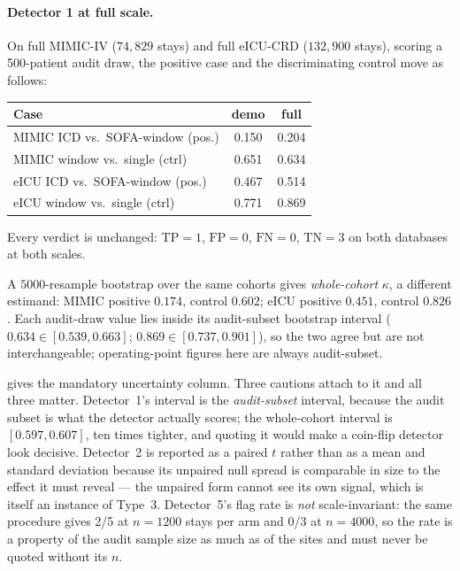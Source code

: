 \documentclass[pmlr,twocolumn,10pt]{jmlr}
\begin{document}
\paragraph{Detector 1 at full scale.} On full MIMIC-IV ($74{,}829$ stays) and
full eICU-CRD ($132{,}900$ stays), scoring a 500-patient audit draw, the
positive case and the discriminating control move as follows:

\begin{center}\footnotesize
\begin{tabular}{@{}lcc@{}}
\toprule
\bfseries Case & \bfseries demo & \bfseries full\\
\midrule
MIMIC ICD vs.\ SOFA-window (pos.) & 0.150 & 0.204\\
MIMIC window vs.\ single (ctrl)   & 0.651 & 0.634\\
eICU ICD vs.\ SOFA-window (pos.)  & 0.467 & 0.514\\
eICU window vs.\ single (ctrl)    & 0.771 & 0.869\\
\bottomrule
\end{tabular}\end{center}

\noindent Every verdict is unchanged: $\mathrm{TP}=1$, $\mathrm{FP}=0$,
$\mathrm{FN}=0$, $\mathrm{TN}=3$ on both databases at both scales.

A $5000$-resample bootstrap over the same cohorts gives \emph{whole-cohort}
$\kappa$, a different estimand: MIMIC positive $0.174$, control
$\mathbf{0.602}$; eICU positive $0.451$, control $0.826$. Each audit-draw value
lies inside its audit-subset bootstrap interval ($0.634 \in [0.539, 0.663]$;
$0.869 \in [0.737, 0.901]$), so the two agree but are not interchangeable;
operating-point figures here are always audit-subset.

 gives the mandatory uncertainty column. Three
cautions attach to it and all three matter. Detector~1's interval is the
\emph{audit-subset} interval, because the audit subset is what the detector
actually scores; the whole-cohort interval is $[0.597, 0.607]$, ten times
tighter, and quoting it would make a coin-flip detector look decisive.
Detector~2 is reported as a paired $t$ rather than as a mean and standard
deviation because its unpaired null spread is comparable in size to the effect
it must reveal --- the unpaired form cannot see its own signal, which is itself
an instance of Type~3. Detector~5's flag rate is \emph{not} scale-invariant: the
same procedure gives 2/5 at $n=1200$ stays per arm and 0/3 at $n=4000$, so the
rate is a property of the audit sample size as much as of the sites and must
never be quoted without its $n$.
\end{document}
